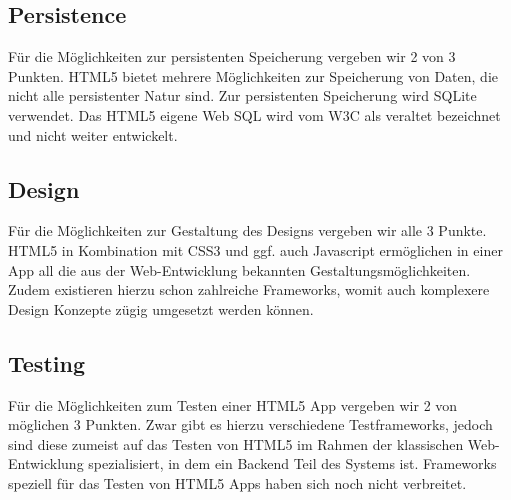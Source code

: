 \subsection{Persistence}
Für die Möglichkeiten zur persistenten Speicherung vergeben wir 2 von 3 Punkten. HTML5 bietet mehrere Möglichkeiten zur Speicherung von Daten, die nicht alle persistenter Natur sind. Zur persistenten Speicherung wird SQLite verwendet. Das HTML5 eigene Web SQL wird vom W3C als veraltet bezeichnet und nicht weiter entwickelt.

\subsection{Design}
Für die Möglichkeiten zur Gestaltung des Designs vergeben wir alle 3 Punkte. HTML5 in Kombination mit CSS3 und ggf. auch Javascript ermöglichen in einer App all die aus der Web-Entwicklung bekannten Gestaltungsmöglichkeiten. Zudem existieren hierzu schon zahlreiche Frameworks, womit auch komplexere Design Konzepte zügig umgesetzt werden können.

\subsection{Testing}
Für die Möglichkeiten zum Testen einer HTML5 App vergeben wir 2 von möglichen 3 Punkten. Zwar gibt es hierzu verschiedene Testframeworks, jedoch sind diese zumeist auf das Testen von HTML5 im Rahmen der klassischen Web-Entwicklung spezialisiert, in dem ein Backend Teil des Systems ist. Frameworks speziell für das Testen von HTML5 Apps haben sich noch nicht verbreitet.
